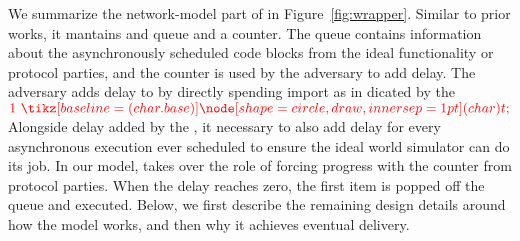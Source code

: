 
We summarize the network-model part of \fwrapper in Figure~\ref{fig:wrapper}.
Similar to prior works, it mantains and queue and a counter.  The queue
contains information about the asynchronously scheduled code blocks from the
ideal functionality or protocol parties, and the counter is used by the
adversary to add delay.  The adversary adds delay to \fwrapper by directly
spending import as in dicated by the {$\color{red} 1 \token$} Alongside delay
added by the \A, it necessary to also add delay for every asynchronous
execution ever scheduled to ensure the ideal world simulator can do its job.
In our model, \Z takes over the role of forcing progress with the counter from
protocol parties.  When the delay reaches zero, the first item is popped off
the queue and executed.  Below, we first describe the remaining design details
around how the model works, and then why it achieves eventual delivery.

